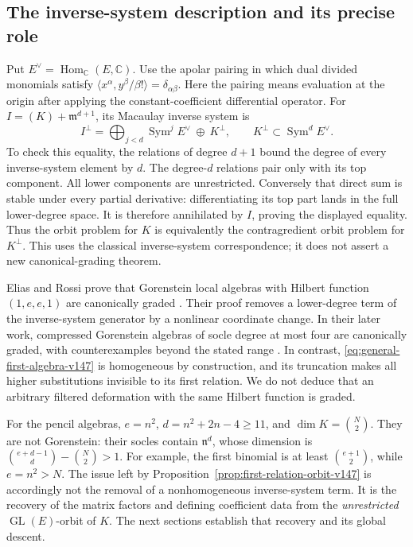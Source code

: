 \documentclass[11pt,reqno]{amsart}
\numberwithin{equation}{section}
\theoremstyle{definition}\newtheorem{definition}[theorem]{Definition}
\theoremstyle{remark}\newtheorem{remark}[theorem]{Remark}
\newcommand{\C}{\mathbb C}\newcommand{\Q}{\mathbb Q}
\DeclareMathOperator{\Sym}{Sym}\DeclareMathOperator{\Gr}{Gr}
\DeclareMathOperator{\Hom}{Hom}\DeclareMathOperator{\Tot}{Tot}
\begin{document}
\subsection{The inverse-system description and its precise role}
Put \(E^{\vee}=\Hom_{\C}(E,\C)\).  Use the apolar pairing in
which dual divided monomials satisfy
\(\langle x^{\alpha},y^{\beta}/\beta!\rangle=\delta_{\alpha\beta}\).
Here the pairing means evaluation at the origin after applying the
constant-coefficient differential operator.  For
\(I=(K)+\mathfrak m^{d+1}\), its Macaulay inverse system is
\begin{equation}\label{eq:inverse-system-v147}
 I^{\perp}=\bigoplus_{j<d}\Sym^j E^{\vee}\ \oplus\ K^{\perp},
              \qquad K^{\perp}\subset\Sym^d E^{\vee}.
\end{equation}
To check this equality, the relations of degree \(d+1\) bound the
degree of every inverse-system element by \(d\).  The degree-\(d\)
relations pair only with its top component.  All lower components are
unrestricted.  Conversely that direct sum is stable under every
partial derivative: differentiating its top part lands in the full
lower-degree space.  It is therefore annihilated by \(I\), proving
the displayed equality.  Thus the orbit problem for \(K\) is
equivalently the contragredient orbit problem for \(K^{\perp}\).
This uses the classical inverse-system correspondence; it does not
assert a new canonical-grading theorem.

Elias and Rossi prove that Gorenstein local algebras with Hilbert
function \((1,e,e,1)\) are canonically graded
\cite[Theorem~3.3 and Corollaries~3.4--3.5]{EliasRossiShort}.
Their proof removes a lower-degree term of the inverse-system
generator by a nonlinear coordinate change.  In their later work,
compressed Gorenstein algebras of socle degree at most four are
canonically graded, with counterexamples beyond the stated range
\cite[Theorem~3.1 and Examples~3.3--3.5]{EliasRossiCompressed}.
In contrast, \eqref{eq:general-first-algebra-v147} is homogeneous by
construction, and its truncation makes all higher substitutions
invisible to its first relation.  We do not deduce that an arbitrary
filtered deformation with the same Hilbert function is graded.

For the pencil algebras, \(e=n^2\), \(d=n^2+2n-4\ge11\), and
\(\dim K=\binom N2\).  They are not Gorenstein: their socles contain
\(\mathfrak n^d\), whose dimension is
\(\binom{e+d-1}{d}-\binom N2>1\).  For example, the first binomial
is at least \(\binom{e+1}{2}\), while \(e=n^2>N\).  The issue
left by Proposition~\ref{prop:first-relation-orbit-v147} is accordingly
not the removal of a nonhomogeneous inverse-system term.  It is the
recovery of the matrix factors and defining coefficient data from the
\emph{unrestricted} \(\operatorname{GL}(E)\)-orbit of \(K\).
The next sections establish that recovery and its global descent.
\end{document}
